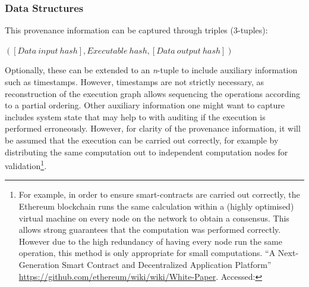 

\subsubsection{Data Structures}


This provenance information can be captured through triples (3-tuples):

$([Data\ input\ hash], Executable\ hash, [Data\ output\ hash])$


Optionally, these can be extended to an \textit{n}-tuple to include auxiliary information such as timestamps. However, timestamps are not strictly necessary, as reconstruction of the execution graph allows sequencing the operations according to a partial ordering. Other auxiliary information one might want to capture includes system state that may help to with auditing if the execution is performed erroneously. However, for clarity of the provenance information, it will be assumed that the execution can be carried out correctly, for example by distributing the same computation out to independent computation nodes for validation\footnote{For example, in order to ensure smart-contracts are carried out correctly, the Ethereum blockchain runs the same calculation within a (highly optimised) virtual machine on every node on the network to obtain a consensus. This allows strong guarantees that the computation was performed correctly. However due to the high redundancy of having every node run the same operation, this method is only appropriate for small computations. ``A Next-Generation Smart Contract and Decentralized Application Platform'' \url{https://github.com/ethereum/wiki/wiki/White-Paper}. Accessed: }.


